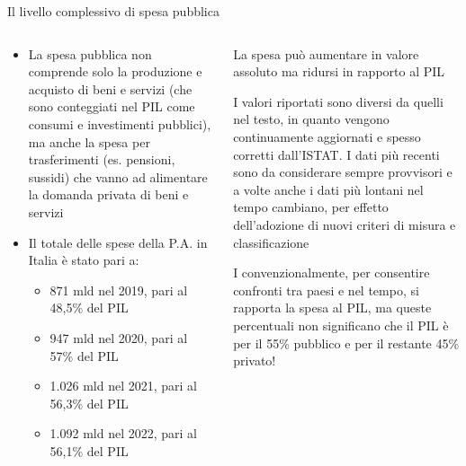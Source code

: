 \documentclass[aspectratio=64,11pt]{beamer}
\begin{document}
\begin{frame}{Il livello complessivo di spesa pubblica}
\begin{columns}
\begin{column}{.6\columnwidth}
\begin{itemize}
\item La spesa pubblica non comprende solo la produzione e acquisto di beni e
servizi (che sono conteggiati nel PIL come consumi e investimenti pubblici),
ma anche la spesa per trasferimenti (es. pensioni, sussidi) che vanno ad
alimentare la domanda privata di beni e servizi

\item Il totale delle spese della P.A. in Italia è stato pari a:
\begin{itemize}
\item 871 mld nel 2019, pari al 48,5\% del PIL
\item 947 mld nel 2020, pari al 57\% del PIL
\item 1.026 mld nel 2021, pari al 56,3\% del PIL
\item 1.092 mld nel 2022, pari al 56,1\% del PIL
\end{itemize}
\end{itemize}
\end{column}

\begin{column}{.4\columnwidth}
\begin{block}{}
\footnotesize
La spesa può aumentare in valore assoluto ma ridursi in rapporto al PIL
\end{block}

\begin{block}{}
\footnotesize
I valori riportati sono diversi da quelli nel testo, in quanto vengono continuamente aggiornati e spesso corretti dall’ISTAT. 
I dati più recenti sono da considerare sempre provvisori e a volte anche i dati più lontani  nel tempo cambiano, per effetto dell’adozione di nuovi criteri di misura e classificazione
\end{block}

\begin{block}{}
\footnotesize
I convenzionalmente, per consentire confronti tra paesi e nel tempo, si rapporta la spesa al PIL, ma queste percentuali \alert{non significano} che il PIL è per il 55\% pubblico e per il restante 45\% privato!
\end{block}
\end{column}
\end{columns}
\end{frame}
\end{document}
